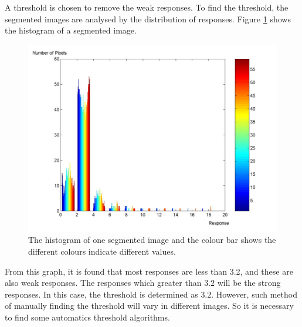 A threshold is chosen to remove the weak responses. To find the threshold, the segmented images are analysed by the distribution of responses. \mbox{Figure} \ref{fig:segmentimagehisto} shows the histogram of a segmented image. 
\begin{figure}[ht]
\begin{center}
 \includegraphics[width=0.66\columnwidth]{ch3/figures/segmentHisto.png}
\caption{The histogram of one segmented image and the colour bar shows the different colours indicate different values.}
\label{fig:segmentimagehisto}
\end{center}
\end{figure} 
From this graph, it is found that most responses are less than 3.2, and these are also weak responses. The responses which greater than $3.2$ will be the strong responses. In this case, the threshold is determined as $3.2$. However, such method of manually finding the threshold will vary in different images. So it is necessary to find some automatics threshold algorithms.

